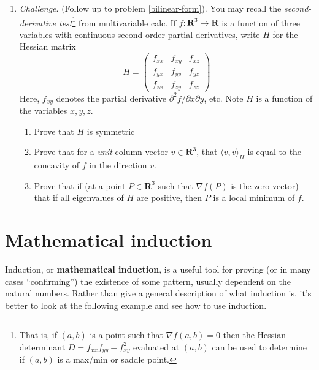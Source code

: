 \documentclass[12pt]{article}
\numberwithin{equation}{subsection}
\theoremstyle{note}
\begin{document}
\begin{enumerate}[label=\arabic*.]
	\item \textit{Challenge}. (Follow up to problem \ref{bilinear-form}). You may recall the \textit{second-derivative test}\footnote{That is, if $(a,b)$ is a point such that $\nabla f(a,b)=0$ then the Hessian determinant $D=f_{xx}f_{yy}-f_{xy}^2$ evaluated at $(a,b)$ can be used to determine if $(a,b)$ is a max/min or saddle point.} from multivariable calc. If $f\colon \mathbf{R}^3\to\mathbf{R}$ is a function of three variables with continuous second-order partial derivatives, write $H$ for the Hessian matrix \[ H= \begin{pmatrix} f_{xx} & f_{xy} & f_{xz} \\ f_{yx} & f_{yy} & f_{yz} \\ f_{zx} & f_{zy} & f_{zz} \end{pmatrix}\]Here, $f_{xy}$ denotes the partial derivative $\partial^2 f/\partial x\partial y$, etc. Note $H$ is a function of the variables $x,y,z$.
	\begin{enumerate}
		\item Prove that $H$ is symmetric
		\item Prove that for a \textit{unit} column vector $v\in\mathbf{R}^3$, that $\langle v,v\rangle_H$ is equal to the concavity of $f$ in the direction $v$.
		\item Prove that if (at a point $P\in\mathbf{R}^3$ such that $\nabla f(P)$ is the zero vector) that if all eigenvalues of $H$ are positive, then $P$ is a local minimum of $f$. 
	\end{enumerate}	

	

\end{enumerate}

\appendix
\section{Mathematical induction}

Induction, or \textbf{mathematical induction}, is a useful tool for proving (or in many cases ``confirming'') the existence of some pattern, usually dependent on the natural numbers. Rather than give a general description of what induction is, it's better to look at the following example and see how to use induction. 
\end{document}

